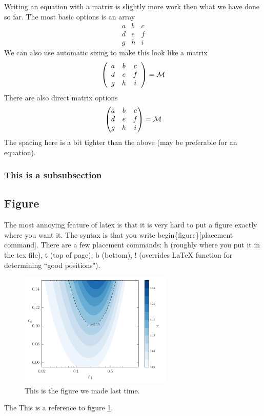 \documentclass[11pt]{article}
\numberwithin{equation}{section}
\def\beq{\begin{equation}}
\def\eeq{\end{equation}}
\begin{document}
Writing an equation with a matrix is slightly more work then what we have done so far. The most basic options is an array
\beq
\begin{array}{ccc}
a & b & c \\
d & e & f \\
g & h & i \end{array}
\eeq
We can also use automatic sizing to make this look like a matrix
\beq
\left(\begin{array}{ccc}
a & b & c \\
d & e & f \\
g & h & i \end{array}\right) = {\cal M}
\eeq
There are also direct matrix options 
\beq
\begin{pmatrix}
a & b & c \\
d & e & f \\
g & h & i \end{pmatrix} ={\cal M}
\eeq
The spacing here is a bit tighter than the above (may be preferable for an equation).

\subsubsection{This is a subsubsection}

\subsection{Figure}

The most annoying feature of latex is that it is very hard to put a figure exactly where you want it. The syntax is that you write begin\{figure\}[placement command].  There are a few placement commands: h (roughly where you put it in the tex file), t (top of page), b (bottom), ! (overrides LaTeX function for determining ``good positions").

\begin{figure}[h!]
\begin{center}
\includegraphics[width=0.65\textwidth]{rcs}
\caption{This is the figure we made last time. }
\label{figurename}
\end{center}
\end{figure}
The This is a reference to figure \ref{figurename}.
\end{document}
